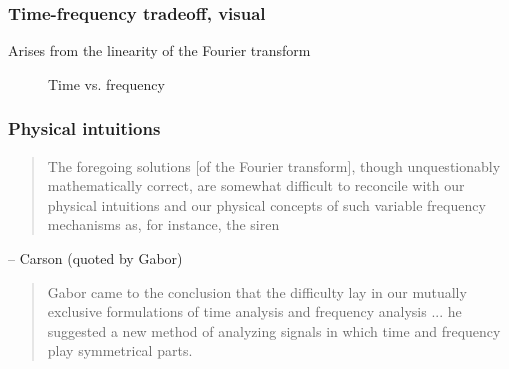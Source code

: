 \documentclass{beamer}
\begin{document}
\begin{frame}
	\frametitle{Time-frequency tradeoff, visual}
	Arises from the linearity of the Fourier transform
	\begin{figure}
		\centering
		\hspace{0.2em}
		\caption{Time vs. frequency}
	\end{figure}
\end{frame}

\begin{frame}
	\frametitle{Physical intuitions}
	\begin{quote}
		The foregoing solutions [of the Fourier transform], though unquestionably mathematically correct, are somewhat difficult to reconcile with our physical intuitions and our physical concepts of such variable frequency mechanisms as, for instance, the siren
	\end{quote}
	-- Carson (quoted by Gabor)
	\begin{quote}
	\vspace{2em}
		Gabor came to the conclusion that the difficulty lay in our mutually exclusive formulations of time analysis and frequency analysis ... he suggested a new method of analyzing signals in which time and frequency play symmetrical parts.
	\end{quote}
\end{frame}

\end{document}
